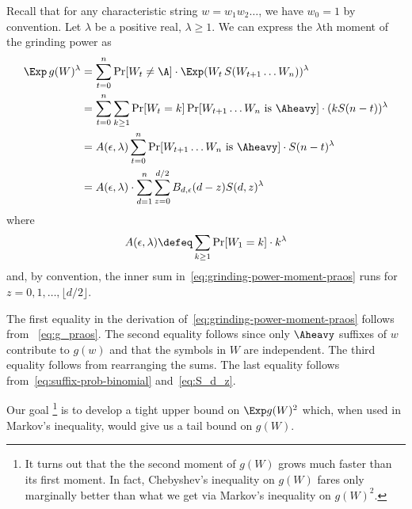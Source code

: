 Recall that for any characteristic string $w = w_1 w_2 \ldots$, 
we have $w_0 = 1$ by convention. 
Let $\lambda$ be a positive real, $\lambda \geq 1$. 
We can express the $\lambda$th moment of the grinding power as
\begin{align}\label{eq:grinding-power-moment-praos}
    \Exp\, g(W)^\lambda 
    &= \sum_{t = 0}^n \Pr[W_t \neq \A] \cdot \Exp (W_t\, S(W_{t+1}\ldots W_n))^\lambda \nonumber \\
    &= \sum_{t = 0}^n
    \sum_{k \geq 1} 
      \Pr[W_{t} = k] \Pr[\text{$W_{t+1}\ldots W_n$ is $\Aheavy$}]\cdot (k S(n - t) )^\lambda \nonumber \\
    &= A(\epsilon, \lambda) 
      \sum_{t = 0}^n 
      \Pr[\text{$W_{t+1}\ldots W_n$ is $\Aheavy$}]\cdot S(n-t)^\lambda \nonumber \\
    &=  %
        A(\epsilon, \lambda)
        \cdot 
        \sum_{d=1}^n \sum_{z = 0}^{ d/2 } B_{d, \epsilon}(d - z) S(d,z)^\lambda
\end{align}
where 
\begin{equation}
  A(\epsilon, \lambda) \defeq \sum_{k\geq 1} \Pr[W_1 = k] \cdot k^\lambda
  \label{eq:A}
\end{equation}
and, by convention, 
the inner sum in~\eqref{eq:grinding-power-moment-praos} 
runs for $z = 0, 1, \ldots, \lfloor d/2 \rfloor$.

The first equality in the derivation of~\eqref{eq:grinding-power-moment-praos} follows from 
~\eqref{eq:g_praos}. 
The second equality follows 
since only $\Aheavy$ suffixes of $w$ contribute to $g(w)$ 
and that the symbols in $W$ are independent. 
The third equality follows from rearranging the sums. 
The last equality follows from~\eqref{eq:suffix-prob-binomial} 
and~\eqref{eq:S_d_z}.

Our goal \footnote{
It turns out that the the second moment of $g(W)$ grows 
much faster than its first moment. In fact, 
Chebyshev's inequality on $g(W)$ fares only marginally better 
than what we get via Markov's inequality on $g(W)^2$. 
}
is to develop a tight upper bound on $\Exp g(W)^2$ 
which, when used in Markov's inequality, 
would give us a tail bound on $g(W)$. 

